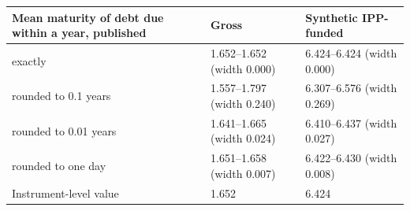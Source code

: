 \begin{tabular}{lll}
\toprule
Mean maturity of debt due within a year, published & Gross & Synthetic IPP-funded \\
\midrule
exactly & 1.652--1.652 (width 0.000) & 6.424--6.424 (width 0.000) \\
rounded to 0.1 years & 1.557--1.797 (width 0.240) & 6.307--6.576 (width 0.269) \\
rounded to 0.01 years & 1.641--1.665 (width 0.024) & 6.410--6.437 (width 0.027) \\
rounded to one day & 1.651--1.658 (width 0.007) & 6.422--6.430 (width 0.008) \\
Instrument-level value & 1.652 & 6.424 \\
\bottomrule
\end{tabular}
